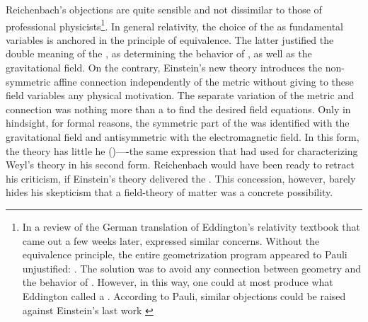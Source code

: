 \documentclass[final]{article}
\newcommand{\WT}{Weyl's theory\xspace}
\begin{document}
Reichenbach's objections are quite sensible and not dissimilar to those of professional physicists\footnote{In a review of the German translation \citep{Eddington1925} of Eddington's relativity textbook \citep{Eddington1923} that came out a few weeks later, \citet{Pauli1926} expressed similar concerns. Without the equivalence principle, the entire geometrization program appeared to Pauli unjustified:  \citep{Pauli1926}. The solution was to avoid any connection between geometry and the behavior of \rac. However, in this way, one could at most produce what Eddington called a . According to Pauli, similar objections could be raised against Einstein's last work \citep{Einstein1925}}. In general relativity, the choice of the \gmn as fundamental variables is anchored in the principle of equivalence. The latter justified the double meaning of the \gmn, as determining the behavior of \rac, as well as the gravitational field. On the contrary, Einstein's new theory introduces the non-symmetric affine connection \Gtmn independently of the metric \gmn without giving to these field variables any physical motivation. The separate variation of the metric and connection was nothing more than a  to find the desired field equations. Only in hindsight, for formal reasons, the symmetric part of the \gmn was identified with the gravitational field and antisymmetric with the electromagnetic field. In this form, the theory has little he  ()----the same expression that \citet[367]{Reichenbach1921} had used for characterizing \WT in his second form. Reichenbach would have been ready to retract his criticism, if Einstein's theory delivered the . This concession, however, barely hides his skepticism that a field-theory of matter was a concrete possibility.
\end{document}
